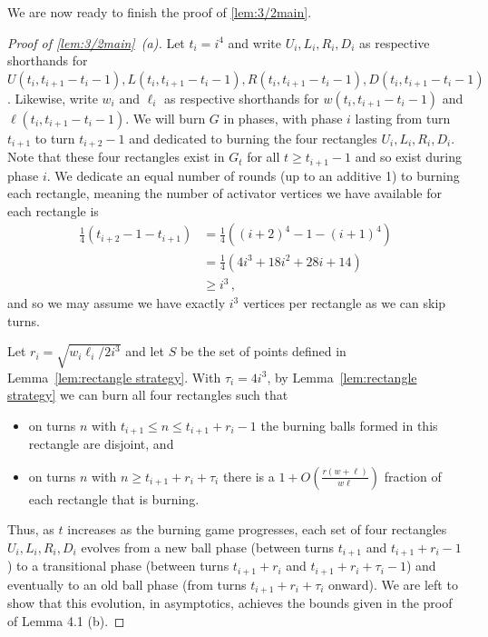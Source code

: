 \documentclass[12pt]{article}
\theoremstyle{remark}
\begin{document}
We are now ready to finish the proof of \cref{lem:3/2main}.

\begin{proof}[Proof of \cref{lem:3/2main}~(a)]
Let $t_i = i^4$ and write $U_i, L_i, R_i, D_i$ as respective shorthands for $U(t_i, t_{i+1}-t_i-1), L(t_i, t_{i+1}-t_i-1), R(t_i, t_{i+1}-t_i-1), D(t_i, t_{i+1}-t_i-1)$. Likewise, write $w_i$ and $\ell_i$ as respective shorthands for $w(t_i, t_{i+1}-t_i-1)$ and $\ell(t_i, t_{i+1}-t_i-1)$. We will burn $G$ in phases, with phase $i$ lasting from turn $t_{i+1}$ to turn $t_{i+2}-1$ and dedicated to burning the four rectangles $U_i, L_i, R_i, D_i$. Note that these four rectangles exist in $G_t$ for all $t \geq t_{i+1}-1$ and so exist during phase $i$. We dedicate an equal number of rounds (up to an additive 1) to burning each rectangle, meaning the number of activator vertices we have available for each rectangle is 
\begin{align*}
\frac{1}{4} \left( t_{i+2}-1 - t_{i+1} \right)
&=
\frac{1}{4} \left( (i+2)^4 - 1 - (i+1)^4 \right)\\
&=
\frac{1}{4} (4i^3 + 18i^2 + 28i + 14)\\
&\geq
i^3 \,,
\end{align*}
and so we may assume we have exactly $i^3$ vertices per rectangle as we can skip turns. 

Let $r_i = \sqrt{w_i \ell_i/2i^3}$ and let $S$ be the set of points defined in Lemma~\ref{lem:rectangle strategy}. With $\tau_i = 4i^3$, by Lemma~\ref{lem:rectangle strategy} we can burn all four rectangles such that
\begin{itemize}
\item on turns $n$ with $t_{i+1} \leq n \leq t_{i+1} + r_i - 1$ the burning balls formed in this rectangle are disjoint, and 
\item on turns $n$ with $n \geq t_{i+1} + r_i + \tau_i$ there is a $1+O\left( \frac{r(w+\ell)}{w \ell} \right)$ fraction of each rectangle that is burning. 
\end{itemize}
Thus, as $t$ increases as the burning game progresses, each set of four rectangles $U_i, L_i, R_i, D_i$ evolves from a new ball  phase (between turns $t_{i+1}$ and $t_{i+1} + r_i - 1$) to a transitional phase (between turns $t_{i+1} + r_i$ and $t_{i+1} + r_i + \tau_i - 1$) and eventually to an old ball phase (from turns $t_{i+1} + r_i + \tau_i$ onward). We are left to show that this evolution, in asymptotics, achieves the bounds given in the proof of Lemma 4.1 (b).


\end{proof}
\end{document}
